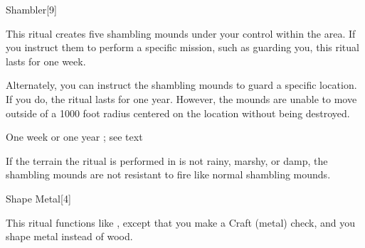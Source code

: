 \begin{spellsection}{Shambler}[9]
    \begin{spellheader}
    \end{spellheader}
    \begin{spellcontent}
        \begin{spelltargetinginfo}
        \end{spelltargetinginfo}
        \begin{spelleffects}

            \spellline
            \spelleffect This ritual creates five shambling mounds under your control within the area. If you instruct them to perform a specific mission, such as guarding you, this ritual lasts for one week.

            Alternately, you can instruct the shambling mounds to guard a specific location. If you do, the ritual lasts for one year. However, the mounds are unable to move outside of a 1000 foot radius centered on the location without being destroyed.

            \spelldur One week or one year \dismissable; see text
        \end{spelleffects}
    \end{spellcontent}
    \begin{spellfooter}
        \spellnotes If the terrain the ritual is performed in is not rainy, marshy, or damp, the shambling mounds are not resistant to fire like normal shambling mounds.
    \end{spellfooter}
\end{spellsection}

\begin{spellsection}{Shape Metal}[4]
    \begin{spellheader}
    \end{spellheader}
    \begin{spellcontent}
        \begin{spelltargetinginfo}
        \end{spelltargetinginfo}
        \begin{spelleffects}

            \spellspecial This ritual functions like , except that you make a Craft (metal) check, and you shape metal instead of wood.
        \end{spelleffects}
    \end{spellcontent}
    \begin{spellfooter}
    \end{spellfooter}
\end{spellsection}

